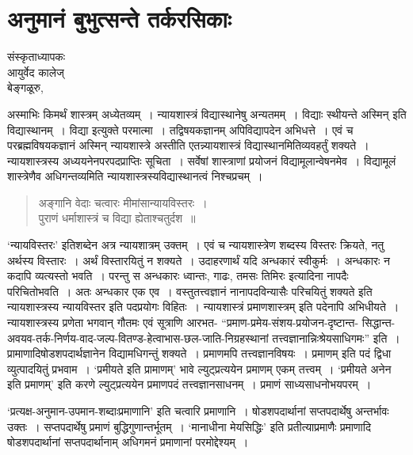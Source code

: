 {\fontsize{15}{17}\selectfont
\presetvalues
\chapter{अनुमानं बुभुत्सन्ते  तर्करसिकाः}

\begin{center}
\smallskip
संस्कृताध्यापकः\\
आयुर्वेद कालेज्\\ 
बेङ्गळूरु,
\addrule
\end{center}

अस्माभिः किमर्थं शास्त्रम् अध्येतव्यम्~। न्यायशास्त्रं विद्यास्थानेषु अन्यतमम्~। विद्याः स्थीयन्ते अस्मिन् इति विद्यास्थानम्~। विद्या इत्युक्ते परमात्मा~। तद्विषयकज्ञानम् अपिविद्यापदेन अभिधत्ते~। एवं च परब्रह्मविषयकज्ञानं अस्मिन् न्यायशास्त्रे अस्तीति एतन्न्यायशास्त्रं विद्यास्थानमितिव्यवहर्तुं शक्यते~। न्यायशास्त्रस्य अध्ययनेनपरपदप्राप्तिः सूचिता~। सर्वेषां शास्त्राणां प्रयोजनं विद्यामूलान्वेषनमेव~। विद्यामूलं शास्त्रेणैव अधिगन्तव्यमिति न्यायशास्त्रस्यविद्यास्थानत्वं निश्चप्रचम्~। 
\begin{verse}
अङ्गानि वेदाः चत्वारः मीमांसान्यायविस्तरः~। \\
पुराणं धर्माशास्त्रं च विद्या ह्येताश्चतुर्दश~॥
\end{verse}
‘न्यायविस्तरः’ इतिशब्देन अत्र न्यायशात्रम् उक्तम्~। एवं च न्यायशास्त्रेण शब्दस्य विस्तरः क्रियते, नतु अर्थस्य विस्तारः~। अर्थं विस्तारयितुं न शक्यते~। उदाहरणार्थं यदि अन्धकारं स्वीकुर्मः~। अन्धकारः न कदापि व्यत्यस्तो भवति~। परन्तु स अन्धकारः ध्वान्तः, गाढः, तमसः तिमिरः इत्यादिना नापदैः परिचितोभवति~। अतः अन्धकार एक एव~। वस्तुतत्त्वज्ञानं नानापदविन्यासैः परिचयितुं शक्यते इति न्यायशास्त्रस्य न्यायविस्तर इति पदप्रयोगः विहितः~। न्यायशास्त्रं प्रमाणशास्त्रम् इति पदेनापि अभिधीयते~।  न्यायशास्त्रस्य प्रणेता भगवान् गौतमः एवं सूत्राणि आरभत- “प्रमाण-प्रमेय-संशय-प्रयोजन-दृष्टान्त- सिद्धान्त-अवयव-तर्क-निर्णय-वाद-जल्प-वितण्ड-हेत्वाभास-छल-जाति-निग्रहस्थानां तत्त्वज्ञानान्निःश्रेयसाधिगमः” इति~। प्रामाणादिषोडशपदार्थज्ञानेन विद्यामधिगन्तुं शक्यते~। प्रमाणमपि तत्त्वज्ञानविषयः~। प्रमाणम् इति पदं द्विधा व्युत्पादयितुं प्रभवाम~। ‘प्रमीयते इति प्रामाणम्’ भावे ल्युट्प्रत्ययेन प्रमाणम् एकम् तत्त्वम्~। ‘प्रमीयते अनेन इति प्रमाणम्’ इति करणे ल्युट्प्रत्ययेन प्रमाणपदं तत्त्वज्ञानसाधनम्~। प्रमाणं साध्यसाधनोभयपरम्~। 

‘प्रत्यक्ष-अनुमान-उपमान-शब्दाःप्रमाणानि’ इति चत्वारि प्रमाणानि~। षोडशपदार्थानां सप्तपदार्थेषु अन्तर्भावः उक्तः~। सप्तपदार्थेषु प्रमाणं बुद्धिगुणान्तर्भूतम्~। ‘मानाधीना मेयसिद्धिः’ इति प्रतीत्याप्रमाणैः प्रमाणादि षोडशपदार्थानां सप्तपदार्थानाम् अधिगमनं प्रमाणानां परमोद्देश्यम्~। 

}
